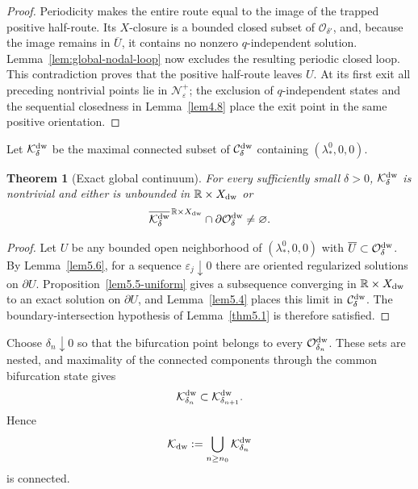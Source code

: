 \documentclass[11pt,reqno]{amsart}
\numberwithin{equation}{section}
\newtheorem{theorem}{Theorem}[section]
\theoremstyle{definition}
\theoremstyle{remark}
\begin{document}
\begin{proof}
Periodicity makes the entire route equal to the image of the trapped
positive half-route.  Its $X$-closure is a bounded closed subset of
$\mathcal O_{\delta'}$, and, because the image remains in
$\overline U$, it contains no nonzero $q$-independent solution.
Lemma~\ref{lem:global-nodal-loop} now excludes the resulting periodic
closed loop.  This contradiction proves that the positive half-route
leaves $U$.  At its first exit all preceding nontrivial points lie in
$\mathcal N_\varepsilon^+$; the exclusion of $q$-independent states
and the sequential closedness in Lemma~\ref{lem4.8} place the exit
point in the same positive orientation.
\end{proof}

Let $\mathcal K_\delta^{\rm dw}$ be the maximal connected subset of
$\mathcal C_\delta^{\rm dw}$ containing $(\lambda_*^0,0,0)$.

\begin{theorem}[Exact global continuum]
\label{thm5.7}
For every sufficiently small $\delta>0$,
$\mathcal K_\delta^{\rm dw}$ is nontrivial and either is unbounded in
$\mathbb R\times X_{\rm dw}$ or
\[
 \overline{\mathcal K_\delta^{\rm dw}}^{\,\mathbb R\times X_{\rm dw}}
 \cap\partial\mathcal O_\delta^{\rm dw}\ne\varnothing.
\]
\end{theorem}
\begin{proof}
Let $U$ be any bounded open neighborhood of $(\lambda_*^0,0,0)$ with
$\overline U\subset\mathcal O_\delta^{\rm dw}$.  By
Lemma~\ref{lem5.6}, for a sequence $\varepsilon_j\downarrow0$ there
are oriented regularized solutions on $\partial U$.
Proposition~\ref{lem5.5-uniform} gives a subsequence converging in
$\mathbb R\times X_{\rm dw}$ to an exact solution on $\partial U$,
and Lemma~\ref{lem5.4} places this limit in
$\mathcal C_\delta^{\rm dw}$.  The boundary-intersection hypothesis of
Lemma~\ref{thm5.1} is therefore satisfied.
\end{proof}

Choose $\delta_n\downarrow0$ so that the bifurcation point belongs to
every $\mathcal O_{\delta_n}^{\rm dw}$.  These sets are nested, and
maximality of the connected components through the common bifurcation
state gives
\[
 \mathcal K_{\delta_n}^{\rm dw}\subset
 \mathcal K_{\delta_{n+1}}^{\rm dw}.
\]
Hence
\begin{equation}\label{eq5dw:Kglobal}
 \mathcal K_{\rm dw}:=\bigcup_{n\ge n_0}\mathcal K_{\delta_n}^{\rm dw}
\end{equation}
is connected.
\end{document}
